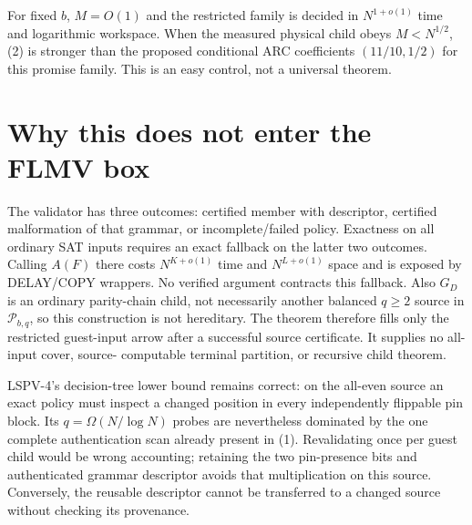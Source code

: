 \documentclass[11pt]{article}
\begin{document}
For fixed $b$, $M=O(1)$ and the restricted family is decided in
$N^{1+o(1)}$ time and logarithmic workspace.  When the measured physical
child obeys $M<N^{1/2}$, (2) is stronger than the proposed conditional ARC
coefficients $(11/10,1/2)$ for this promise family.  This is an easy control,
not a universal theorem.

\section{Why this does not enter the FLMV box}
The validator has three outcomes: certified member with descriptor, certified
malformation of that grammar, or incomplete/failed policy.  Exactness on all
ordinary SAT inputs requires an exact fallback on the latter two outcomes.
Calling $A(F)$ there costs $N^{K+o(1)}$ time and $N^{L+o(1)}$ space and is
exposed by DELAY/COPY wrappers.  No verified argument contracts this fallback.
Also $G_D$ is an ordinary parity-chain child, not necessarily another balanced
$q\ge2$ source in $\mathcal P_{b,q}$, so this construction is not hereditary.
The theorem therefore fills only the restricted guest-input arrow after a
successful source certificate.  It supplies no all-input cover, source-
computable terminal partition, or recursive child theorem.

LSPV-4's decision-tree lower bound remains correct: on the all-even source an
exact policy must inspect a changed position in every independently flippable
pin block.  Its $q=\Omega(N/\log N)$ probes are nevertheless dominated by the
one complete authentication scan already present in (1).  Revalidating once
per guest child would be wrong accounting; retaining the two pin-presence bits
and authenticated grammar descriptor avoids that multiplication on this
source.  Conversely, the reusable descriptor cannot be transferred to a
changed source without checking its provenance.
\end{document}
